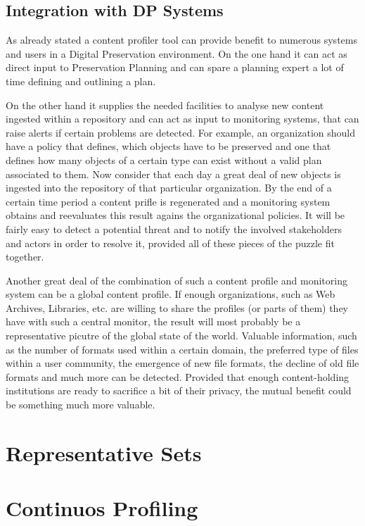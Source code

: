 \subsection{Integration with DP Systems}
As already stated a content profiler tool can provide benefit to numerous systems and users in a Digital Preservation environment. On the one hand it can act as direct input to Preservation Planning and can spare a planning expert a lot of time defining and outlining a plan. 

On the other hand it supplies the needed facilities to analyse new content ingested within a repository and can act as input to monitoring systems, that can raise alerts if certain problems are detected. For example, an organization should have a policy that defines, which objects have to be preserved and one that defines how many objects of a certain type can exist without a valid plan associated to them. Now consider that each day a great deal of new objects is ingested into the repository of that particular organization. By the end of a certain time period a content prifle is regenerated and a monitoring system obtains and reevaluates this result agains the organizational policies. It will be fairly easy to detect a potential threat and to notify the involved stakeholders and actors in order to resolve it, provided all of these pieces of the puzzle fit together.

Another great deal of the combination of such a content profile and monitoring system can be a global content profile. If enough organizations, such as Web Archives, Libraries, etc. are willing to share the profiles (or parts of them) they have with such a central monitor, the result will most probably be a representative picutre of the global state of the world. Valuable information, such as the number of formats used within a certain domain, the preferred type of files within a user community, the emergence of new file formats, the decline of old file formats and much more can be detected. Provided that enough content-holding institutions are ready to sacrifice a bit of their privacy, the mutual benefit could be something much more valuable.

\section{Representative Sets}


\section{Continuos Profiling}
